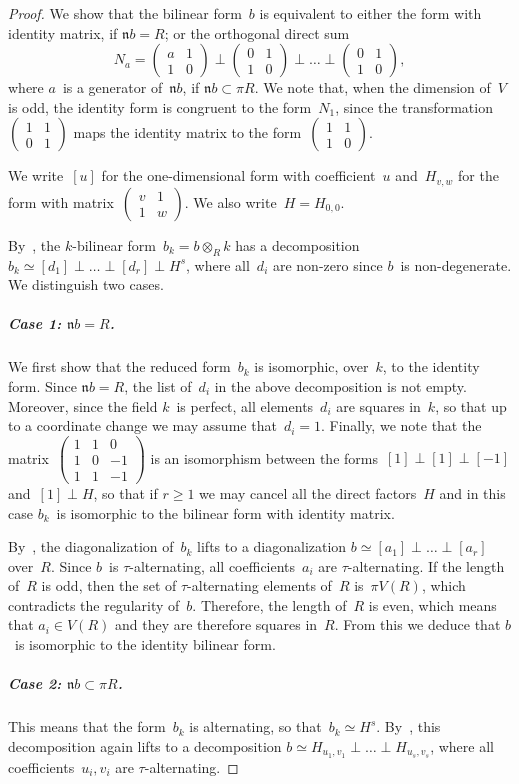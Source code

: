 \documentclass{lms}
\let\fr\mathfrak
\def\mat#1{\begin{pmatrix}#1\end{pmatrix}}
\begin{document}
\begin{proof}
We show that the bilinear form~$b$ is equivalent to either the form with
identity matrix, if $\fr n b = R$; or the orthogonal direct sum
\[ N_a = \mat{a & 1\\1&0} ⟂ \mat{0 & 1\\1&0} ⟂ … ⟂ \mat {0 & 1\\ 1 & 0}, \]
where $a$~is a generator of~$\fr n b$, if $\fr n b ⊂ π R$.
We note that, when the dimension of~$V$ is odd, the identity form is
congruent to the form~$N_1$, since the transformation~$\mat{1&1\\0&1}$
maps the identity matrix to the form~$\mat{1&1\\1&0}$.

We write~$[u]$ for the one-dimensional form with coefficient~$u$
and~$H_{v, w}$ for the form with matrix~$\mat{v&1\\1&w}$.
We also write~$H = H_{0,0}$.

By~\cite[§2]{milnor2}, the $k$-bilinear form~$b_k = b ⊗_R k$ has a
decomposition~$b_k ≃ [d_1] ⟂ … ⟂ [d_r] ⟂ H^s$, where all~$d_i$ are
non-zero since $b$~is non-degenerate. We distinguish two cases.

\subparagraph{Case 1: $\fr n b = R$.}
We first show that the reduced form~$b_k$ is isomorphic, over~$k$, to the
identity form. Since $\fr n b = R$, the list of~$d_i$ in the above
decomposition is not empty. Moreover, since the field $k$~is perfect, all
elements~$d_i$ are squares in~$k$, so that up to a coordinate change we
may assume that~$d_i = 1$. Finally, we note that the
matrix~$\mat{1&1&0\\1&0&-1\\1&1&-1}$ is an isomorphism between the
forms~$[1] ⟂ [1] ⟂ [-1]$ and~$[1] ⟂ H$, so that if $r ≥ 1$ we may cancel
all the direct factors~$H$ and in this case $b_k$~is isomorphic to the
bilinear form with identity matrix.

By~\cite[Corollary 3.4]{baeza1978quadratic},
the diagonalization of~$b_k$ lifts to a diagonalization
$b ≃ [a_1] ⟂ … ⟂ [a_r]$ over~$R$.
Since $b$~is $τ$-alternating, all coefficients~$a_i$ are $τ$-alternating.
If the length of~$R$ is odd, then the set of $τ$-alternating elements of~$R$
is~$π V(R)$, which contradicts the regularity of~$b$.
Therefore, the length of~$R$ is even, which means that $a_i ∈ V(R)$ and they are
therefore squares in~$R$.
From this we deduce that $b$~is isomorphic to the identity bilinear form.

\subparagraph{Case 2: $\fr n b ⊂ π R$.}
This means that the form~$b_k$ is alternating, so that~$b_k ≃ H^s$.
By~\cite[Corollary 3.4]{baeza1978quadratic}, this decomposition again lifts to a
decomposition $b ≃ H_{u_1, v_1} ⟂ … ⟂ H_{u_s, v_s}$, where all
coefficients~$u_i, v_i$ are $τ$-alternating.


\end{proof}
\end{document}
